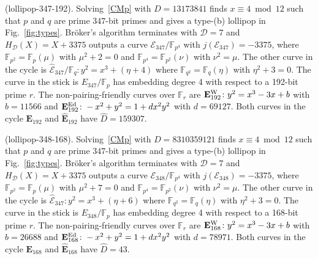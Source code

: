 \documentclass[version=preprint]{iacrcc}
\newcommand{\F}{\mathbb{F}}
\newcommand{\EC}{\mathcal{E}}
\newcommand{\D}{\mathcal{D}}
\begin{document}
\begin{example}(\textsf{lollipop-347-192}).\label{example:347-192} 
Solving~\eqref{CMp} with $D=13173841$ finds $x \equiv 4 \bmod{12}$ such that $p$ and $q$ are prime $347$-bit primes and gives a type-(b) lollipop in Fig.~\ref{fig:types}. Br{\"o}ker's algorithm terminates with $\D=7$ and $H_\D(X)= X + 3375$ outputs a curve ${\EC}_{347}/\F_{p^4}$ with $j({\EC}_{347})=-3375$, where $\F_{p^2}=\F_p(\mu)$ with $\mu^2+2=0$ and $\F_{p^4}=\F_{p^2}(\nu)$ with $\nu^2=\mu$. The other curve in the cycle is $\hat{\EC}_{347}/\F_q \colon y^2=x^3+(\eta+4)$ where  $\F_{q^2}=\F_q(\eta)$ with $\eta^2+3=0$. The curve in the stick is $E_{347}/\F_p$ has embedding degree 4 with respect to a 192-bit prime $r$. The non-pairing-friendly curves over $\F_r$ are $\mathbf{E}_{192}^{\rm W} \colon y^2=x^3-3x+b$ with $b=11566$ and $\mathbf{E}_{192}^{\rm Ed} \colon -x^2+y^2=1+dx^2y^2$ with $d=69127$. Both curves in the cycle $\mathbf{E}_{192}$ and $\hat{\mathbf{E}}_{192}$ have $\hat{D}=159307$. 
\end{example}

\begin{example}(\textsf{lollipop-348-168}).\label{example:348-168} 
Solving~\eqref{CMp} with $D=8310359121$ finds $x \equiv 4 \bmod{12}$ such that $p$ and $q$ are prime $347$-bit primes and gives a type-(b) lollipop in Fig.~\ref{fig:types}. Br{\"o}ker's algorithm terminates with $\D=7$ and $H_\D(X)= X + 3375$ outputs a curve ${\EC}_{348}/\F_{p^4}$ with $j({\EC}_{348})=-3375$, where $\F_{p^2}=\F_p(\mu)$ with $\mu^2+7=0$ and $\F_{p^4}=\F_{p^2}(\nu)$ with $\nu^2=\mu$. The other curve in the cycle is $\hat{\EC}_{347} \colon y^2=x^3+(\eta+6)$ where  $\F_{q^2}=\F_q(\eta)$ with $\eta^2+3=0$. The curve in the stick is $E_{348}/\F_p$ has embedding degree 4 with respect to a 168-bit prime $r$. The non-pairing-friendly curves over $\F_r$ are $\mathbf{E}_{168}^{\rm W} \colon y^2=x^3-3x+b$ with $b=26688$ and $\mathbf{E}_{168}^{\rm Ed} \colon -x^2+y^2=1+dx^2y^2$ with $d=78971$. Both curves in the cycle $\mathbf{E}_{168}$ and $\hat{\mathbf{E}}_{168}$ have $\hat{D}=43$. 
\end{example}
\end{document}
